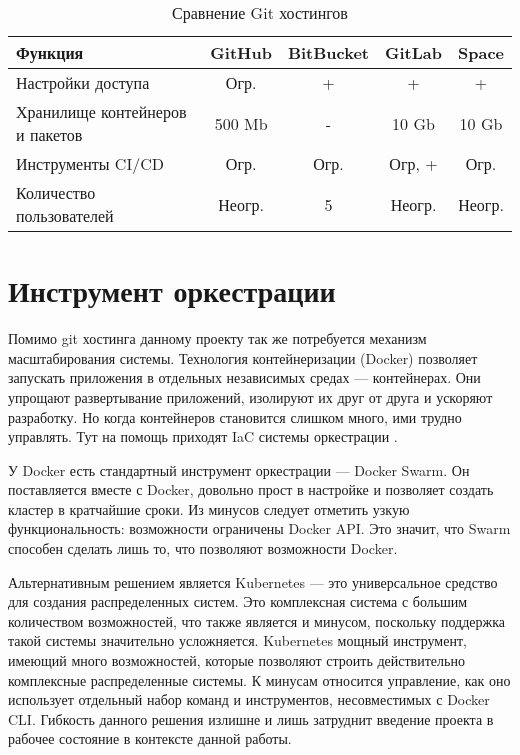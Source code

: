 \begin{center}
    \begin{longtable}{|p{}|c|c|c|c|}
        \caption{Сравнение Git хостингов}
        \label{tab:git-hostings}
        \hline
        Функция                             & GitHub          & BitBucket   & GitLab    & Space \\
        \hline
        Настройки доступа                   & Огр.            & +           & +         & +     \\
        Хранилище контейнеров и пакетов     & 500 Mb          & -           & 10 Gb     & 10 Gb \\
        Инструменты CI/CD                   & Огр.            & Огр.        & Огр, +    & Огр.  \\
        Количество пользователей            & Неогр.          & 5           & Неогр.    & Неогр.\\
        \hline
    \end{longtable}
\end{center}

\section{Инструмент оркестрации}

Помимо git хостинга данному проекту так же потребуется механизм масштабирования системы.
Технология контейнеризации (Docker) позволяет запускать приложения в отдельных независимых средах --- контейнерах.
Они упрощают развертывание приложений, изолируют их друг от друга и ускоряют разработку.
Но когда контейнеров становится слишком много, ими трудно управлять.
Тут на помощь приходят IaC системы оркестрации \cite{likeGoogle}.

У Docker есть стандартный инструмент оркестрации --- Docker Swarm.
Он поставляется вместе с Docker, довольно прост в настройке и позволяет создать кластер в кратчайшие сроки.
Из минусов следует отметить узкую функциональность: возможности ограничены Docker API.
Это значит, что Swarm способен сделать лишь то, что позволяют возможности Docker\cite{fasterDevOps}.

Альтернативным решением является Kubernetes --- это универсальное средство для создания распределенных систем.
Это комплексная система с большим количеством возможностей, что также является и минусом, поскольку поддержка такой системы значительно усложняется.
Kubernetes мощный инструмент, имеющий много возможностей, которые позволяют строить действительно комплексные распределенные системы.
К минусам относится управление, как оно использует отдельный набор команд и инструментов, несовместимых с Docker CLI\cite{web:docker-kubernetes}.
Гибкость данного решения излишне и лишь затруднит введение проекта в рабочее состояние в контексте данной работы.

